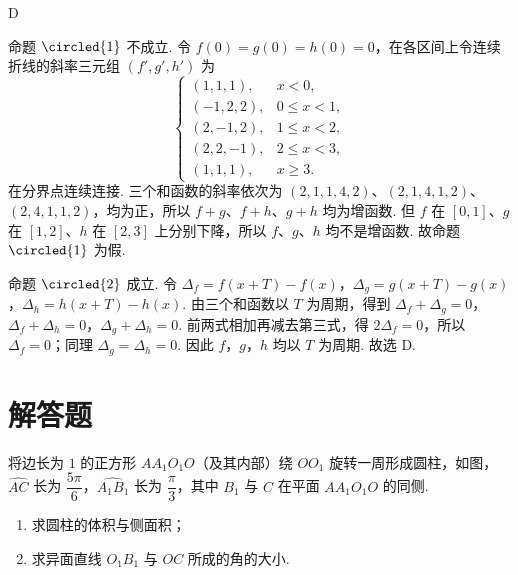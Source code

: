 \begin{answer}
D
\end{answer}

\begin{solution}
命题 \(\circled{1}\) 不成立. 令 \(f(0)=g(0)=h(0)=0\)，在各区间上令连续折线的斜率三元组 \((f',g',h')\) 为
\[
\begin{cases}
(1,1,1),&x<0,\\
(-1,2,2),&0\leqslant x<1,\\
(2,-1,2),&1\leqslant x<2,\\
(2,2,-1),&2\leqslant x<3,\\
(1,1,1),&x\geqslant3.
\end{cases}
\]
在分界点连续连接. 三个和函数的斜率依次为 \((2,1,1,4,2)\)、\((2,1,4,1,2)\)、\((2,4,1,1,2)\)，均为正，所以 \(f+g\)、\(f+h\)、\(g+h\) 均为增函数. 但 \(f\) 在 \([0,1]\)、\(g\) 在 \([1,2]\)、\(h\) 在 \([2,3]\) 上分别下降，所以 \(f\)、\(g\)、\(h\) 均不是增函数. 故命题 \(\circled{1}\) 为假.

命题 \(\circled{2}\) 成立. 令
\(\Delta_f=f(x+T)-f(x)\)，\(\Delta_g=g(x+T)-g(x)\)，\(\Delta_h=h(x+T)-h(x)\). 由三个和函数以 \(T\) 为周期，得到
\(\Delta_f+\Delta_g=0\)，\(\Delta_f+\Delta_h=0\)，\(\Delta_g+\Delta_h=0\). 前两式相加再减去第三式，得 \(2\Delta_f=0\)，所以 \(\Delta_f=0\)；同理 \(\Delta_g=\Delta_h=0\). 因此 \(f\)，\(g\)，\(h\) 均以 \(T\) 为周期. 故选 D.
\end{solution}

\section{解答题}

\begin{problem}
将边长为 \(1\) 的正方形 \(AA_1O_1O\)（及其内部）绕 \(OO_1\) 旋转一周形成圆柱，如图，\(\widehat{AC}\) 长为 \(\dfrac{5\pi}{6}\)，\(\widehat{A_1B_1}\) 长为 \(\dfrac{\pi}{3}\)，其中 \(B_1\) 与 \(C\) 在平面 \(AA_1O_1O\) 的同侧.

\begin{enumerate}
\item 求圆柱的体积与侧面积；
\item 求异面直线 \(O_1B_1\) 与 \(OC\) 所成的角的大小.
\end{enumerate}

\end{problem}

